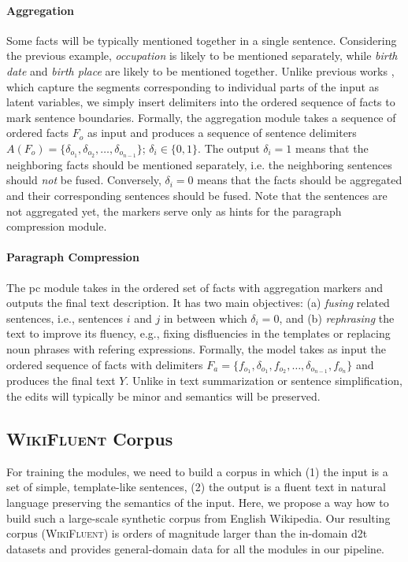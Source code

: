 \paragraph{Aggregation} Some facts will be typically mentioned together in a single sentence. Considering the previous example, \textit{occupation} is likely to be mentioned separately, while \textit{birth date} and \textit{birth place} are likely to be mentioned together. Unlike previous works \cite{wiseman2018learning,shao-etal-2019-long,shen-etal-2020-neural,xuAGGGENOrderingAggregating2021}, which capture the segments corresponding to individual parts of the input as latent variables, we simply insert delimiters into the ordered sequence of facts to mark sentence boundaries.
Formally, the aggregation module takes a sequence of ordered facts $F_o$ as input and produces a sequence of sentence delimiters $A(F_o) = \{\delta_{o_1}, \delta_{o_2}, \ldots, \delta_{o_{n-1}}\}$; $\delta_{i} \in \{0, 1\}$. The output $\delta_{i}=1$ means that the neighboring facts should be mentioned separately, i.e. the neighboring sentences should \textit{not} be fused. Conversely, $\delta_{i}=0$ means that the facts should be aggregated and their corresponding sentences should be fused. Note that the sentences are not aggregated yet, the markers serve only as hints for the paragraph compression module.



\paragraph{Paragraph Compression}  The \ac{pc} module takes in the ordered set of facts with aggregation markers and outputs the final text description.  It has two main objectives: (a) \textit{fusing} related sentences, i.e., sentences $i$ and $j$ in between which $\delta_{i}=0$, and (b) \textit{rephrasing} the text to improve its fluency, e.g., fixing disfluencies in the templates or replacing noun phrases with refering expressions. Formally, the model takes as input the ordered sequence of facts with delimiters $F_a = \{f_{o_1}, \delta_{o_1}, f_{o_2}, \ldots, \delta_{o_{n-1}}, f_{o_n}\}$ and produces the final text $Y$. Unlike in text summarization or sentence simplification, the edits will typically be minor and semantics will be preserved.



\subsection{\textsc{WikiFluent} Corpus}
\label{sec:pipeline:wikifluent}
For training the modules, we need to build a corpus in which (1) the input is a set of simple, template-like sentences, (2) the output is a fluent text in natural language preserving the semantics of the input. Here, we propose a way how to build such a large-scale synthetic corpus from English Wikipedia. Our resulting corpus (\textsc{WikiFluent}) is orders of magnitude larger than the in-domain \ac{d2t} datasets and provides general-domain data for all the modules in our pipeline.

